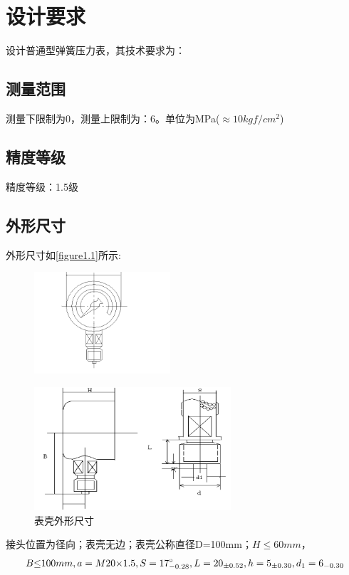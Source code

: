 \section{设计要求}
设计普通型弹簧压力表，其技术要求为：
\subsection{测量范围}
测量下限制为0，测量上限制为：6。单位为MPa(${\approx}10kgf/cm^2$)
\subsection{精度等级}
精度等级：1.5级
\subsection{外形尺寸}
外形尺寸如\autoref{figure1.1}所示:
\begin{figure}[!htbp]
    \centering
    \includegraphics[width =0.45\textwidth]{figures/1.1.1.png}
    \caption{}
\end{figure}
\begin{figure}[!htbp]
    \centering
    \includegraphics[width =0.65\textwidth]{figures/1.1.2.png}
    \caption{表壳外形尺寸}
    \label{figure1.1}
\end{figure}
\newline
接头位置为径向；表壳无边；表壳公称直径D=100mm；$H{\le}60mm$，
\begin{equation}
{B{\le}100mm,a=M20{\times}1.5,S=17_{-0.28}^{\circ},\\L=20_{{\pm}0.52},h=5_{{\pm}0.30},d_{1}=6_{-0.30}}\nonumber
\end{equation}
